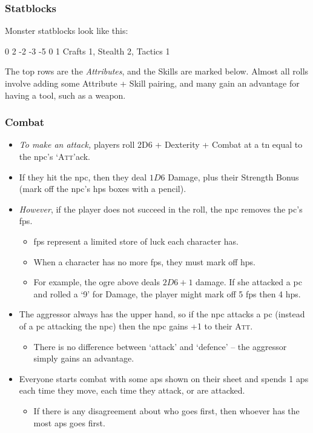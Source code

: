 \begin{multicols}{2}
{  \subsubsection{Statblocks}
  Monster statblocks look like this:

  {0}%
  {2}%
  {{-2}%
  {-3}%
  {-5}}%
  {0}%
  {1}%
  {Crafts 1, Stealth 2, Tactics 1}%
  {\Dagger}%
  {}

  The top rows are the \textit{Attributes}, and the Skills are marked below.
  Almost all rolls involve adding some Attribute + Skill pairing, and many gain an advantage for having a tool, such as a weapon.

  \subsubsection{Combat}

  \begin{itemize}

    \item
    \textit{To make an attack,} players roll 2D6 + Dexterity + Combat at a \gls{tn} equal to the \gls{npc}'s `{\scshape Att}'ack.
    \item
    If they hit the \gls{npc}, then they deal $1D6$ Damage, plus their Strength Bonus (mark off the \gls{npc}'s \glspl{hp} boxes with a pencil).
    \item
    \emph{However}, if the player does not succeed in the roll, the \gls{npc} removes the \gls{pc}'s \glspl{fp}.
  \begin{itemize}
    \item
    \Glspl{fp} represent a limited store of luck each character has.
    \item
    When a character has no more \glspl{fp}, they must mark off \glspl{hp}.
    \item
    For example, the ogre above deals $2D6+1$ damage.
    If she attacked a \gls{pc} and rolled a `9' for Damage, the player might mark off 5 \glspl{fp} then 4 \glspl{hp}.
  \end{itemize}
    \item
    The aggressor always has the upper hand, so if the \gls{npc} attacks a \gls{pc} (instead of a \gls{pc} attacking the \gls{npc}) then the \gls{npc} gains +1 to their {\scshape Att}.
  \begin{itemize}
    \item
    There is no difference between `attack' and `defence' -- the aggressor simply gains an advantage.
  \end{itemize}
    \item
    Everyone starts combat with some \glspl{ap} shown on their sheet and spends 1 \glspl{ap} each time they move, each time they attack, or are attacked.
  \begin{itemize}
    \item
    If there is any disagreement about who goes first, then whoever has the most \glspl{ap} goes first.
  \end{itemize}


\end{itemize}}
\end{multicols}
